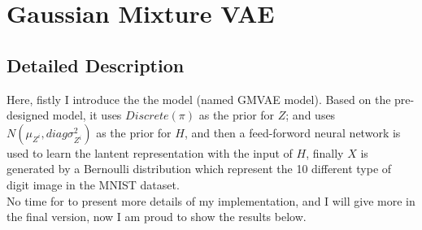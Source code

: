\documentclass[a4paper]{article}
\begin{document}





\section{Gaussian Mixture VAE}

\subsection{Detailed Description}

Here, fistly I introduce the the model (named GMVAE model). Based on the 
pre-designed model,  it uses $Discrete(\pi)$ as the prior for $Z$; and uses 
$N(\mu_{Z^{i}}, diag{\sigma_{Z^{i}}^{2}})$ as the prior for $H$, and then a feed-forword
neural network is used to learn the lantent representation with the input of $H$, finally 
$X$ is generated by a Bernoulli distribution which represent the 10 different type of digit 
image in the MNIST dataset.
\\
No time for to present more details of my implementation, and I will give more in the final version, now I am proud to show the results below.
\end{document}
